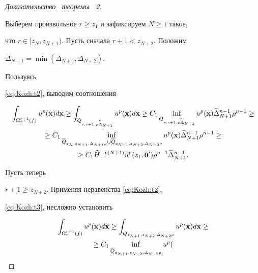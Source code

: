 \begin{proof}[Доказательство \, теоремы \, \rm 2]
\begin{equation}
\end{equation}



Выберем произвольное $r\geq z_1$ и зафиксируем $N\geq 1$ такое,

что $r\in[z_{N},z_{N+1})$. Пусть сначала $r+1<z_{N+2}$. Положим

$\widetilde{\Delta}_{N+1}=\min(\Delta_{N+1},\Delta_{N+2})$.

Пользуясь

 \eqref{eq:Kozh:t2}, выводим соотношения

\begin{multline*}

\int _{\Omega_{r}^{{r+1}}(f)}u^{p}({\bf x })d{\bf x}\geq

\int _{Q_{r,r+1, \rho\widetilde{\Delta}_{N+1}}}u^{p}({\bf x

})d{\bf x}\geq C_1\inf\limits_{Q_{r,r+1,

\rho\widetilde{\Delta}_{N+1}}}u^{p}({\bf x

})\widetilde{\Delta}_{N+1}^{n-1}\rho^{n-1}\geq \\

\geq

C_1\inf\limits_{\overline{Q}_{z_{N},z_{N+1},\Delta_{N+1}\rho}\cup

\overline{Q}_{z_{N+1},z_{N+2},\Delta_{N+2}\rho}}u^{p}({\bf x

})\widetilde{\Delta}_{N+1}^{n-1}\rho^{n-1}\geq \\

\geq C_1\widehat{H}^{-p(N+1)} u^{p}(z_1,{\bf

0}')\rho^{n-1}\widetilde{\Delta}_{N+1}^{n-1}.

\end{multline*}



 Пусть теперь

$r+1\geq z_{N+2}$.  Применяя неравенства \eqref{eq:Kozh:t2},

\eqref{eq:Kozh:t3}, несложно установить

\begin{multline*}

\int _{\Omega_{r}^{{r+1}}(f)}u^{p}({\bf x })d{\bf x}\geq

\int _{Q_{z_{N+1},z_{N+2},\Delta_{N+2}\rho}}u^{p}({\bf x

})d{\bf x}\geq \\

\geq

C_1\inf\limits_{\overline{Q}_{z_{N+1},z_{N+2},\Delta_{N+2}\rho}}u^{p}({\bf

}
\end{multline*}
\end{proof}
